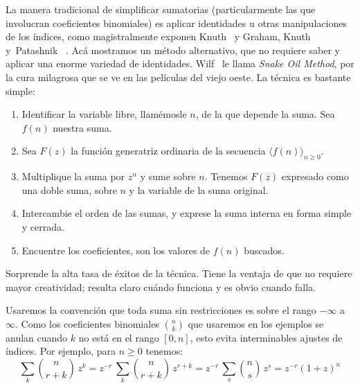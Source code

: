   La manera tradicional de simplificar sumatorias
  (particularmente las que involucran coeficientes binomiales)
  es aplicar identidades u otras manipulaciones de los índices,
  como magistralmente exponen Knuth~%
    \cite{knuth97:_fundam_algor}
  y Graham, Knuth y~Patashnik~%
    \cite{graham94:_concr_mathem}.
  Acá mostramos un método alternativo,
  que no requiere saber y aplicar
  una enorme variedad de identidades.
  Wilf~%
    \cite{wilf06:_gfology}
  le llama \emph{\foreignlanguage{english}{Snake Oil Method}},
  por la cura milagrosa que se ve en las películas del viejo oeste.
  La técnica es bastante simple:
  \begin{enumerate}
  \item
    Identificar la variable libre,
    llamémosle \(n\),
    de la que depende la suma.
    Sea \(f(n)\) nuestra suma.
  \item
    Sea \(F(z)\) la función generatriz ordinaria
    de la secuencia \(\langle f(n) \rangle_{n \ge 0}\).
  \item
    Multiplique la suma por \(z^n\) y sume sobre \(n\).
    Tenemos \(F(z)\) expresado como una doble suma,
    sobre \(n\) y la variable de la suma original.
  \item
    Intercambie el orden de las sumas,
    y exprese la suma interna en forma simple y cerrada.
  \item
    Encuentre los coeficientes,
    son los valores de \(f(n)\) buscados.
  \end{enumerate}
  Sorprende la alta tasa de éxitos de la técnica.
  Tiene la ventaja de que no requiere mayor creatividad;
  resulta claro cuándo funciona
  y es obvio cuando falla.

  Usaremos la convención que toda suma sin restricciones
  es sobre el rango \(-\infty\) a \(\infty\).
  Como los coeficientes binomiales \(\binom{n}{k}\)
  que usaremos en los ejemplos se anulan cuando
  \(k\) no está en el rango \([0, n]\),
  esto evita interminables ajustes de índices.
  Por ejemplo,
  para \(n \ge 0\) tenemos:
  \begin{equation*}
    \sum_k \binom{n}{r + k} \, z^k
      = z^{-r} \, \sum_k \binom{n}{r + k} \, z^{r + k}
      = z^{-r} \, \sum_s \binom{n}{s} \, z^s
      = z^{-r} (1 + z)^n
  \end{equation*}

